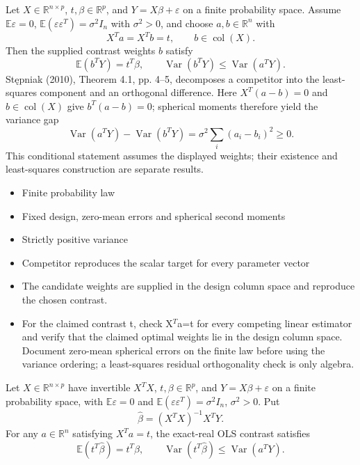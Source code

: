 \expandafter\def\csname statadic@statement@STATADIC-LINEAR-004\endcsname{Let $X\in\mathbb R^{n\times p}$, $t,\beta\in\mathbb R^p$,
  and $Y=X\beta+\varepsilon$ on a finite probability space. Assume
  $\mathbb E\varepsilon=0$, $\mathbb E(\varepsilon\varepsilon^T)=\sigma^2I_n$
  with $\sigma^2>0$, and choose $a,b\in\mathbb R^n$ with
  \[ X^Ta=X^Tb=t,\qquad b\in\operatorname{col}(X). \]
  Then the supplied contrast weights $b$ satisfy
  \[ \mathbb E(b^TY)=t^T\beta,\qquad
     \operatorname{Var}(b^TY)\leq\operatorname{Var}(a^TY). \]}
\expandafter\def\csname statadic@proof@STATADIC-LINEAR-004\endcsname{Stępniak (2010), Theorem 4.1, pp. 4--5, decomposes a
  competitor into the least-squares component and an orthogonal difference.
  Here $X^T(a-b)=0$ and $b\in\operatorname{col}(X)$ give $b^T(a-b)=0$;
  spherical moments therefore yield the variance gap
  \[ \operatorname{Var}(a^TY)-\operatorname{Var}(b^TY)
     =\sigma^2\sum_i(a_i-b_i)^2\geq0. \]
  This conditional statement assumes the displayed weights; their existence
  and least-squares construction are separate results.}
\expandafter\def\csname statadic@assumptions@STATADIC-LINEAR-004\endcsname{\begin{itemize}
\item Finite probability law
\item Fixed design, zero-mean errors and spherical second moments
\item Strictly positive variance
\item Competitor reproduces the scalar target for every parameter vector
\item The candidate weights are supplied in the design column space and reproduce the chosen contrast.
\end{itemize}}
\expandafter\def\csname statadic@diagnostics@STATADIC-LINEAR-004\endcsname{\begin{itemize}
\item For the claimed contrast t, check X\ensuremath{{}^T}a=t for every competing linear estimator and verify that the claimed optimal weights lie in the design column space. Document zero-mean spherical errors on the finite law before using the variance ordering; a least-squares residual orthogonality check is only algebra.
\end{itemize}}
\expandafter\def\csname statadic@statement@STATADIC-LINEAR-005\endcsname{Let $X\in\mathbb R^{n\times p}$ have invertible $X^TX$,
  $t,\beta\in\mathbb R^p$, and $Y=X\beta+\varepsilon$ on a finite probability
  space, with $\mathbb E\varepsilon=0$ and
  $\mathbb E(\varepsilon\varepsilon^T)=\sigma^2 I_n$, $\sigma^2>0$. Put
  \[ \hat\beta=(X^TX)^{-1}X^TY. \]
  For any $a\in\mathbb R^n$ satisfying $X^Ta=t$, the exact-real OLS contrast
  satisfies
  \[ \mathbb E(t^T\hat\beta)=t^T\beta,\qquad
     \operatorname{Var}(t^T\hat\beta)\leq\operatorname{Var}(a^TY). \]}
